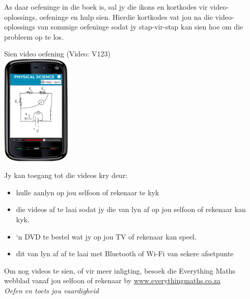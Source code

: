 {

As daar oefeninge in die boek is, sal jy die ikons en kortkodes vir video-oplossings, oefeninge en hulp sien. Hierdie kortkodes vat jou na die video-oplossings van sommige oefeninge sodat jy stap-vir-stap kan sien hoe om die probleem op te los. \par

\begin{center}
 Sien video oefening  (Video: V123) \vspace{0.4cm}\\
\includegraphics[width=0.25\textwidth]{title_images/mobilevideoexercise.png}
\end{center}
Jy kan toegang tot die videos kry deur:
\begin{itemize}[noitemsep]
\item hulle aanlyn op jou selfoon of rekenaar te kyk
\item die videos af te laai sodat jy die van lyn af op jou selfoon of rekenaar kan kyk.
\item ‘n DVD te bestel wat jy op jou TV of rekenaar kan speel.
\item dit van lyn af af te laai met Bluetooth of Wi-Fi van sekere afsetpunte
\end{itemize}
}



Om nog videos te sien, of vir meer inligting, besoek die Everything Maths webblad vanaf jou selfoon of rekenaar by \underline{www.everythingmaths.co.za}  
\vspace*{1cm}
\\
{\normalfont\sffamily\fontsize{22}\normalfont\itshape Oefen en toets jou vaardigheid} \par


